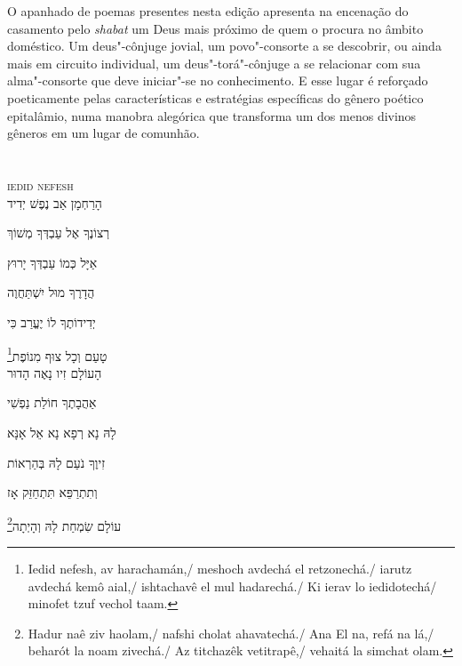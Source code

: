 O apanhado de poemas presentes nesta edição apresenta na encenação do
casamento pelo \emph{shabat} um Deus mais próximo de quem o procura no âmbito
doméstico. Um deus"-cônjuge jovial, um povo"-consorte a se descobrir, ou
ainda mais em circuito individual, um deus"-torá"-cônjuge a se relacionar
com sua alma"-consorte que deve iniciar"-se no conhecimento. E esse lugar
é reforçado poeticamente pelas características e estratégias específicas
do gênero poético epitalâmio, numa manobra alegórica que transforma um
dos menos divinos gêneros em um lugar de comunhão.



\chapter*{}
\begin{center}
\begin{vplace}[0.3]
\Large
{}
\end{vplace}
\end{center}
\thispagestyle{empty}

\begingroup
\movetoevenpage
\raggedleft

\vspace*{1cm}

\textsc{iedid nefesh}\\[15pt]

הָרַחְמָן אַב נֶפֶשׁ יְדִיד

רְצוֹנֶךָ אֶל עַבְדְּךָ מְשׁוֹךְ

אַיָּל כְּמוֹ עַבְדְּךָ יָרוּץ

הֲדָרֶךָ מוּל יִשְׁתַּחֲוֶה

יְדִידוֹתֶךָ לוֹ יֶעֱרַב  כִּי

\footnote{Iedid nefesh, av harachamán,/ meshoch avdechá el retzonechá./ iarutz avdechá kemô aial,/ ishtachavê el mul hadarechá./ Ki ierav lo iedidotechá/ minofet tzuf vechol taam.}טָעַם וְכָל צוּף מִנוֹפֶת\\[10pt]

הָעוֹלָם זִיו נָאֶה הָדוּר

אַהֲבָתֶךָ חוֹלַת נַפְשִׁי

לָהּ נָא רְפָא נָא אֵל אָנָּא

זִיוֶךָ נֹעַם לָהּ בְּהַרְאוֹת

וְתִתְרַפֵּא תִּתְחַזֵּק אָז

\footnote{Hadur naê ziv haolam,/ nafshi cholat ahavatechá./ Ana El na, refá na lá,/ beharót la noam zivechá./ Az titchazêk vetitrapê,/ vehaitá la simchat olam.}עוֹלָם שִׂמְחַת לָהּ וְהָיְתָה\\[10pt]

